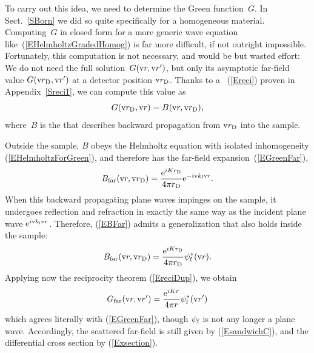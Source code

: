 To carry out this idea, we need to determine the Green function~$G$.
%
In Sect.~\ref{SBorn} we did so quite specifically
for a homogeneous material.
Computing~$G$ in closed form for a more generic wave equation
like~(\ref{EHelmholtzGradedHomog}) is far more difficult,
if not outright impossible.
Fortunately, this computation is not necessary,
and would be but wasted effort:
We do not need the full solution~$G(\text{v}{r},\text{v}{r}')$,
but only its asymptotic far-field value $G(\text{v}{r}_\text{D},\text{v}{r}')$
at a detector position $\text{v}{r}_\text{D}$.
%
Thanks to a ~(\ref{Ereci})
%
proven in Appendix~\ref{Sreci1},
we can compute this value
as
\begin{equation}\label{EreciDup}
  G(\text{v}{r}_\text{D},\text{v}{r}) = B(\text{v}{r},\text{v}{r}_\text{D}),
\end{equation}
%
where~$B$ is the 
that describes backward propagation from $\text{v}{r}_\text{D}$ into the sample.

Outside the sample,
$B$ obeys the Helmholtz equation
with isolated inhomogeneity (\ref{EHelmholtzForGreen}),
and therefore has the far-field expansion~(\ref{EGreenFar}),
%
\begin{equation}\label{EBFar}
  B_\text{far}(\text{v}{r},\text{v}{r}_\text{D})
  =\frac{\text{e}^{iKr_\text{D}}}{4\pi r_\text{D}}\text{e}^{-i\text{v}{k}_{\text{f}} \text{v}{r}}.
\end{equation}
When this backward propagating plane waves impinges on the sample,
it undergoes reflection and refraction in exactly the same way as
the incident plane wave $\text{e}^{i\text{v}{k}_{\text{i}}\text{v}{r}}$.
Therefore,
 (\ref{EBFar}) admits a generalization that also holds inside the sample:
\begin{equation}\label{EBFull}
  B_\text{far}(\text{v}{r},\text{v}{r}_\text{D})
  = \frac{\text{e}^{iKr_\text{D}}}{4\pi r_\text{D}}\psi^*_{\text{f}}(\text{v}{r}).
\end{equation}
Applying now the reciprocity theorem (\ref{EreciDup}),
we obtain
\begin{equation}\label{EGreenFarDWBA}
  G_\text{far}(\text{v}{r},\text{v}{r}')
  = \frac{\text{e}^{iKr}}{4\pi r}\psi^*_{\text{f}}(\text{v}{r}')
\end{equation}
which agrees literally with (\ref{EGreenFar}),
though $\psi_{\text{f}}$ is not any longer a plane wave.
Accordingly,
the scattered far-field is still given by (\ref{EsandwichC}),
and the differential cross section by (\ref{Exsection}).

